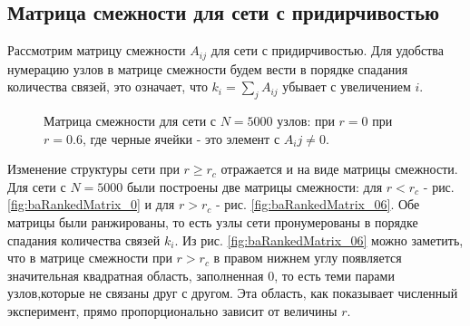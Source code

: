 \documentclass[10pt,aps,pra]{revtex4-1}
\begin{document}
    \subsection{Матрица смежности для сети с придирчивостью}

        Рассмотрим матрицу смежности $A_{ij}$ для сети с придирчивостью. Для удобства нумерацию узлов в матрице смежности будем вести в порядке спадания количества связей, это означает, что $k_i=\sum\limits_{j}A_{ij}$ убывает с увеличением $i$.

            \begin{figure}[H]  
                \centering

                \caption{
                    \label{fig:baRankedMatrix}
                    Матрица смежности для сети с $N=5000$ узлов:
                      при $r=0$
                     при $r=0.6$, где черные ячейки - это элемент с $A_ij \neq 0$.
                }
            \end{figure}

        Изменение структуры сети при $r \geq r_c$ отражается и на виде матрицы смежности. Для сети с $N=5000$ были построены две матрицы смежности: для $r<r_c$ - рис. \ref{fig:baRankedMatrix_0} и для $r>r_c$ - рис. \ref{fig:baRankedMatrix_06}. Обе матрицы были ранжированы, то есть узлы сети пронумерованы в порядке спадания количества связей $k_i$. Из рис. \ref{fig:baRankedMatrix_06} можно заметить, что в матрице смежности при $r>r_c$ в правом нижнем углу появляется значительная квадратная область, заполненная 0, то есть теми парами узлов,которые не связаны друг с другом. Эта область, как показывает численный эксперимент, прямо пропорционально зависит от величины $r$.
\end{document}
